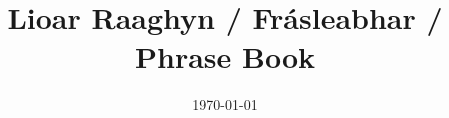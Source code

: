 \documentclass[9pt]{extbook}
\begin{document}
      
\begin{frontmatter}
\title{\Huge\bf Lioar Raaghyn / Frásleabhar / Phrase Book}
\date{\today}
\maketitle
{}

\end{frontmatter}

\begin{mainmatter}

\end{mainmatter}
\end{document}
